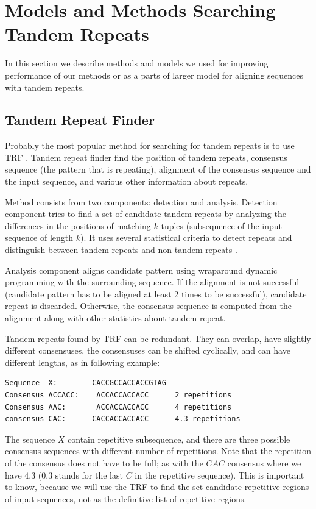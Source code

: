 \section{Models and Methods Searching Tandem Repeats}

In this section we describe methods and models we used for improving
performance of our methods or as a parts of larger model for aligning sequences
with tandem repeats. 

\subsection{Tandem Repeat Finder}

Probably the most popular method for searching for tandem repeats is to use TRF
\cite{Benson1999}.  Tandem repeat finder find the position of tandem repeats,
consensus sequence (the pattern that is repeating), alignment of the consensus
sequence and the input sequence, and various other information about repeats.

Method consists from two components: detection and analysis. Detection
component tries to find a set of candidate tandem repeats by analyzing the
differences in the positions of matching $k$-tuples (subsequence of the input
sequence of length $k$). It uses several statistical criteria to detect repeats
and distinguish between tandem repeats and non-tandem repeats
\cite{Benson1999}.

Analysis component aligns candidate pattern using wraparound dynamic
programming \cite{Myers1989} with the surrounding sequence. If the alignment is
not successful (candidate pattern has to be aligned at least $2$ times to be
successful), candidate repeat is discarded. Otherwise, the consensus sequence
is computed from the alignment along with other statistics about tandem repeat.


Tandem repeats found by TRF can be redundant.  They can overlap, have slightly
different consensuses, the consensuses can be shifted cyclically, and can have
different lengths, as in following example:

\begin{verbatim}
Sequence  X:        CACCGCCACCACCGTAG
Consensus ACCACC:    ACCACCACCACC      2 repetitions
Consensus AAC:       ACCACCACCACC      4 repetitions
consensus CAC:      CACCACCACCACC      4.3 repetitions
\end{verbatim}

The sequence $X$ contain repetitive subsequence, and there are three possible
consensus sequences with different number of repetitions. Note that the
repetition of the consensus does not have to be full; as with the $CAC$
consensus where we have $4.3$ ($0.3$ stands for the last $C$ in the repetitive
sequence). This is important to know, because we will use the TRF to find
the set candidate repetitive regions of input sequences, not as the definitive
list of repetitive regions.

